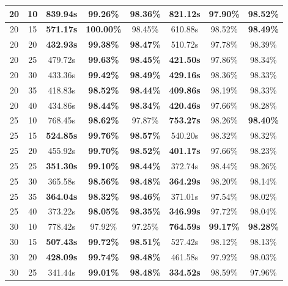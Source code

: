 \begin{table}
\begin{tabular}{|c|c|c|c|c|c|c|c|}
\hline
20 & 10 & 839.94s & \textbf{99.26\%} & 98.36\% & \textbf{821.12s} & 97.90\% & \textbf{98.52\%}  \\
\hline
20 & 15 & \textbf{571.17s} & \textbf{100.00\%} & 98.45\% & 610.88s & 98.52\% & \textbf{98.49\%}  \\
\hline
20 & 20 & \textbf{432.93s} & \textbf{99.38\%} & \textbf{98.47\%} & 510.72s & 97.78\% & 98.39\%  \\
\hline
20 & 25 & 479.72s & \textbf{99.63\%} & \textbf{98.45\%} & \textbf{421.50s} & 97.86\% & 98.34\%  \\
\hline
20 & 30 & 433.36s & \textbf{99.42\%} & \textbf{98.49\%} & \textbf{429.16s} & 98.36\% & 98.33\%  \\
\hline
20 & 35 & 418.83s & \textbf{98.52\%} & \textbf{98.44\%} & \textbf{409.86s} & 98.19\% & 98.33\%  \\
\hline
20 & 40 & 434.86s & \textbf{98.44\%} & \textbf{98.34\%} & \textbf{420.46s} & 97.66\% & 98.28\%  \\
\hline
25 & 10 & 768.45s & \textbf{98.62\%} & 97.87\% & \textbf{753.27s} & 98.26\% & \textbf{98.40\%}  \\
\hline
25 & 15 & \textbf{524.85s} & \textbf{99.76\%} & \textbf{98.57\%} & 540.20s & 98.32\% & 98.32\%  \\
\hline
25 & 20 & 455.92s & \textbf{99.70\%} & \textbf{98.52\%} & \textbf{401.17s} & 97.66\% & 98.23\%  \\
\hline
25 & 25 & \textbf{351.30s} & \textbf{99.10\%} & \textbf{98.44\%} & 372.74s & 98.44\% & 98.26\%  \\
\hline
25 & 30 & 365.58s & \textbf{98.56\%} & \textbf{98.48\%} & \textbf{364.29s} & 98.20\% & 98.14\%  \\
\hline
25 & 35 & \textbf{364.04s} & \textbf{98.32\%} & \textbf{98.46\%} & 371.01s & 97.54\% & 98.02\%  \\
\hline
25 & 40 & 373.22s & \textbf{98.05\%} & \textbf{98.35\%} & \textbf{346.99s} & 97.72\% & 98.04\%  \\
\hline
30 & 10 & 778.42s & 97.92\% & 97.25\% & \textbf{764.59s} & \textbf{99.17\%} & \textbf{98.28\%}  \\
\hline
30 & 15 & \textbf{507.43s} & \textbf{99.72\%} & \textbf{98.51\%} & 527.42s & 98.12\% & 98.13\%  \\
\hline
30 & 20 & \textbf{428.09s} & \textbf{99.74\%} & \textbf{98.48\%} & 461.58s & 97.92\% & 98.03\%  \\
\hline
30 & 25 & 341.44s & \textbf{99.01\%} & \textbf{98.48\%} & \textbf{334.52s} & 98.59\% & 97.96\%  \\

\end{tabular}
\end{table}
